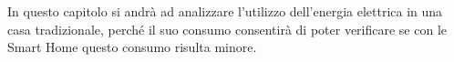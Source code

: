 In questo capitolo si andrà ad analizzare l’utilizzo dell’energia elettrica in una casa tradizionale, perché il suo consumo consentirà di poter verificare se con le Smart Home questo consumo risulta minore. 